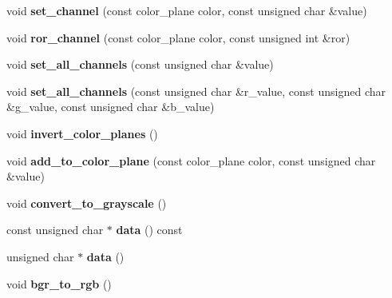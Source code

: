 \begin{DoxyCompactItemize}
\item 
\mbox{\label{classbitmap__image_a8a5a5a6f019fdc20efb08f21daa2aa19}} 
void {\bfseries set\+\_\+channel} (const color\+\_\+plane color, const unsigned char \&value)
\item 
\mbox{\label{classbitmap__image_a309a91712d535dc8301aff51bfa673cb}} 
void {\bfseries ror\+\_\+channel} (const color\+\_\+plane color, const unsigned int \&ror)
\item 
\mbox{\label{classbitmap__image_adff057f9cbb161002b148c4466f230d2}} 
void {\bfseries set\+\_\+all\+\_\+channels} (const unsigned char \&value)
\item 
\mbox{\label{classbitmap__image_a402033cb5e6a68cc443930fc18663258}} 
void {\bfseries set\+\_\+all\+\_\+channels} (const unsigned char \&r\+\_\+value, const unsigned char \&g\+\_\+value, const unsigned char \&b\+\_\+value)
\item 
\mbox{\label{classbitmap__image_aada8401fe2b162bfe24f9b5c6e5c7662}} 
void {\bfseries invert\+\_\+color\+\_\+planes} ()
\item 
\mbox{\label{classbitmap__image_a8c48685a56144f7ce9d4b92f960241ff}} 
void {\bfseries add\+\_\+to\+\_\+color\+\_\+plane} (const color\+\_\+plane color, const unsigned char \&value)
\item 
\mbox{\label{classbitmap__image_a6aedae0246a1ebb01be64e79e6411a9f}} 
void {\bfseries convert\+\_\+to\+\_\+grayscale} ()
\item 
\mbox{\label{classbitmap__image_a464b43d70f88e60694442e2a6e387c55}} 
const unsigned char $\ast$ {\bfseries data} () const
\item 
\mbox{\label{classbitmap__image_a5fe5541d64430f27a9719f87d102d8f5}} 
unsigned char $\ast$ {\bfseries data} ()
\item 
\mbox{\label{classbitmap__image_a07c97f8dce057ebc7d83d19cca16fcc8}} 
void {\bfseries bgr\+\_\+to\+\_\+rgb} ()
\item 

\end{DoxyCompactItemize}
